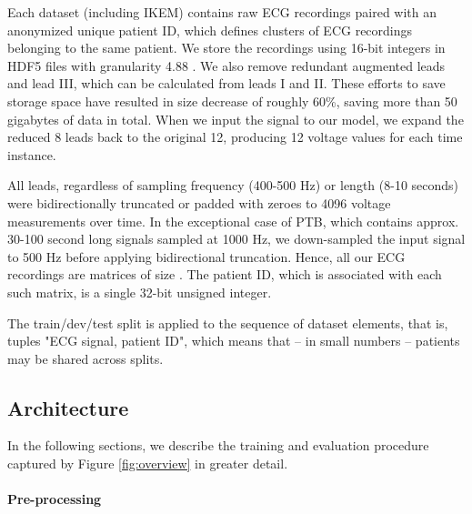 \documentclass[preprint,12pt]{elsarticle}
\begin{document}
Each dataset (including IKEM) contains raw ECG recordings paired with an anonymized unique patient ID, which defines clusters of ECG recordings belonging to the same patient. We store the recordings using 16-bit integers in HDF5 files with granularity 4.88 . We also remove redundant augmented leads and lead III, which can be calculated from leads I and II. These efforts to save storage space have resulted in size decrease of roughly 60\%, saving more than 50 gigabytes of data in total. When we input the signal to our model, we expand the reduced 8 leads back to the original 12, producing 12 voltage values for each time instance.

All leads, regardless of sampling frequency (400-500 Hz) or length (8-10 seconds) were bidirectionally truncated or padded with zeroes to 4096 voltage measurements over time. In the exceptional case of PTB, which contains approx. 30-100 second long signals sampled at 1000 Hz, we down-sampled the input signal to 500 Hz before applying bidirectional truncation. Hence, all our ECG recordings are matrices of size .  The patient ID, which is associated with each such matrix, is a single 32-bit unsigned integer.

The train/dev/test split is applied to the sequence of dataset elements, that is, tuples "ECG signal, patient ID", which means that -- in small numbers -- patients may be shared across splits. 



\subsection{Architecture}

\label{sec:architecture}

In the following sections, we describe the training and evaluation procedure captured by Figure \ref{fig:overview} in greater detail.

\paragraph{Pre-processing}
\end{document}
